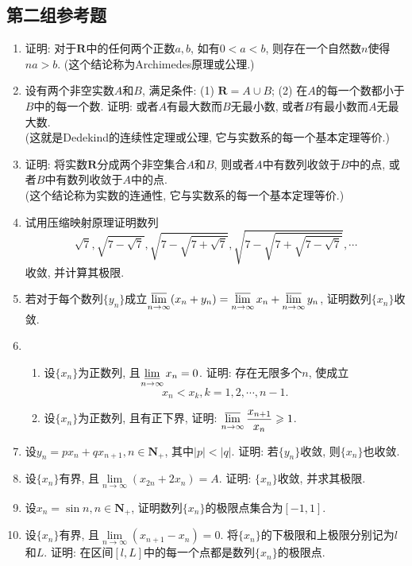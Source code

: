 \documentclass[a4paper,11pt,twoside]{ctexbook}
\begin{document}
\subsection{第二组参考题}
\begin{enumerate}
	\item 证明: 对于$\mathbf{R}$中的任何两个正数$a,b$, 如有$0<a<b$, 则存在一个自然数$n$使得$na>b$. (这个结论称为Archimedes原理或公理.)

	\item 设有两个非空实数$A$和$B$, 满足条件: (1) $\mathbf{R}=A\cup B$; (2) 在$A$的每一个数都小于$B$中的每一个数. 证明: 或者$A$有最大数而$B$无最小数, 或者$B$有最小数而$A$无最大数.\\
	      (这就是Dedekind的连续性定理或公理, 它与实数系的每一个基本定理等价.)

	\item 证明: 将实数$\mathbf{R}$分成两个非空集合$A$和$B$, 则或者$A$中有数列收敛于$B$中的点, 或者$B$中有数列收敛于$A$中的点.\\
	      (这个结论称为实数的连通性, 它与实数系的每一个基本定理等价.)

	\item 试用压缩映射原理证明数列
	      \[
		      \sqrt{7}, \sqrt{7-\sqrt{7}}, \sqrt{7-\sqrt{7+\sqrt{7}}}, \sqrt{7-\sqrt{7+\sqrt{7-\sqrt{7}}}}, \cdots
	      \]
	      收敛, 并计算其极限.

	\item 若对于每个数列$\{y_n\}$成立$\varlimsup\limits_{n\to\infty}(x_n+y_n)=\varlimsup\limits_{n\to\infty} x_n+\varlimsup\limits_{n\to\infty} y_n$, 证明数列$\{x_n\}$收敛.

	\item
	      \begin{enumerate}[(1)]
		      \item 设$\{x_n\}$为正数列, 且$\varliminf\limits_{n\to\infty} x_n=0$. 证明: 存在无限多个$n$, 使成立
		            \[
			            x_n<x_k, k=1,2,\cdots,n-1.
		            \]
		      \item 设$\{x_n\}$为正数列, 且有正下界, 证明: $\varlimsup\limits_{n\to\infty} \dfrac{x_{n+1}}{x_n}\geqslant 1$.
	      \end{enumerate}

	\item 设$y_n=px_n+qx_{n+1}, n\in\mathbf{N}_{+}$, 其中$|p|<|q|$. 证明: 若$\{y_n\}$收敛, 则$\{x_n\}$也收敛.

	\item 设$\{x_n\}$有界, 且$\lim\limits_{n\to\infty} (x_{2n}+2x_n)=A$. 证明: $\{x_n\}$收敛, 并求其极限.

	\item 设$x_n=\sin{n}, n\in\mathbf{N}_{+}$, 证明数列$\{x_n\}$的极限点集合为$[-1,1]$.

	\item 设$\{x_n\}$有界, 且$\lim\limits_{n\to\infty} (x_{n+1}-x_n)=0$. 将$\{x_n\}$的下极限和上极限分别记为$l$和$L$. 证明: 在区间$[l,L]$中的每一个点都是数列$\{x_n\}$的极限点.
\end{enumerate}

\ifx\all\undefined
\end{document}
